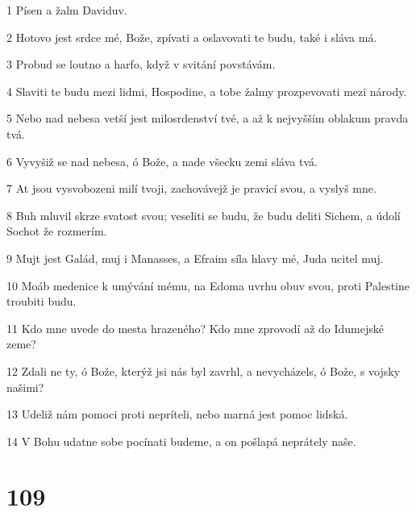 \par 1 Písen a žalm Daviduv.
\par 2 Hotovo jest srdce mé, Bože, zpívati a oslavovati te budu, také i sláva má.
\par 3 Probud se loutno a harfo, když v svitání povstávám.
\par 4 Slaviti te budu mezi lidmi, Hospodine, a tobe žalmy prozpevovati mezi národy.
\par 5 Nebo nad nebesa vetší jest milosrdenství tvé, a až k nejvyšším oblakum pravda tvá.
\par 6 Vyvyšiž se nad nebesa, ó Bože, a nade všecku zemi sláva tvá.
\par 7 At jsou vysvobozeni milí tvoji, zachovávejž je pravicí svou, a vyslyš mne.
\par 8 Buh mluvil skrze svatost svou; veseliti se budu, že budu deliti Sichem, a údolí Sochot že rozmerím.
\par 9 Mujt jest Galád, muj i Manasses, a Efraim síla hlavy mé, Juda ucitel muj.
\par 10 Moáb medenice k umývání mému, na Edoma uvrhu obuv svou, proti Palestine troubiti budu.
\par 11 Kdo mne uvede do mesta hrazeného? Kdo mne zprovodí až do Idumejské zeme?
\par 12 Zdali ne ty, ó Bože, kterýž jsi nás byl zavrhl, a nevycházels, ó Bože, s vojsky našimi?
\par 13 Udeliž nám pomoci proti nepríteli, nebo marná jest pomoc lidská.
\par 14 V Bohu udatne sobe pocínati budeme, a on pošlapá neprátely naše.

\chapter{109}

